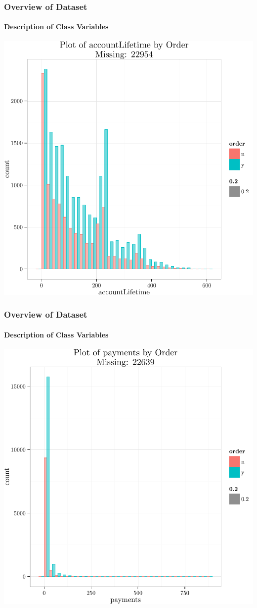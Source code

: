 \documentclass[xcolor=dvipsnames,gray,mathserif]{beamer}
\begin{document}
\begin{frame}
   \frametitle{Overview of Dataset}
   \framesubtitle{Description of Class Variables}

   \centerline{\includegraphics[width=.8\linewidth,height=.8\linewidth]{./figs/graphics-SingleDimPlot5}}
\end{frame}
\begin{frame}
   \frametitle{Overview of Dataset}
   \framesubtitle{Description of Class Variables}

   \centerline{\includegraphics[width=.8\linewidth,height=.8\linewidth]{./figs/graphics-SingleDimPlot6}}
\end{frame}
\end{document}
